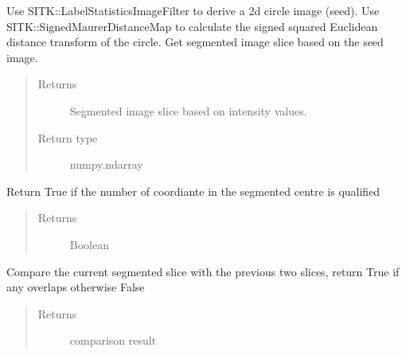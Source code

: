 \documentclass[letterpaper,10pt,english]{sphinxmanual}
\begin{document}
\begin{fulllineitems}
\begin{fulllineitems}
\label{\detokenize{AortaGeomReconDisplayModuleLib:AortaSegmenter.AortaSegmenter.__get_image_segment}}
\sphinxAtStartPar
Use SITK::LabelStatisticsImageFilter to derive a 2d circle image (seed).
Use SITK::SignedMaurerDistanceMap to calculate the signed squared Euclidean distance transform of the circle.
Get segmented image slice based on the seed image.
\begin{quote}\begin{description}
\item[{Returns}] \leavevmode
\sphinxAtStartPar
Segmented image slice based on intensity values.

\item[{Return type}] \leavevmode
\sphinxAtStartPar
numpy.ndarray

\end{description}\end{quote}

\end{fulllineitems}


\begin{fulllineitems}
\label{\detokenize{AortaGeomReconDisplayModuleLib:AortaSegmenter.AortaSegmenter.__is_new_centre_qualified}}
\sphinxAtStartPar
Return True if the number of coordiante in the segmented centre is qualified
\begin{quote}\begin{description}
\item[{Returns}] \leavevmode
\sphinxAtStartPar
Boolean

\end{description}\end{quote}

\end{fulllineitems}


\begin{fulllineitems}
\label{\detokenize{AortaGeomReconDisplayModuleLib:AortaSegmenter.AortaSegmenter.__is_overlapping}}
\sphinxAtStartPar
Compare the current segmented slice with the previous two slices,
return True if any overlaps otherwise False
\begin{quote}\begin{description}
\item[{Returns}] \leavevmode
\sphinxAtStartPar
comparison result


\end{description}
\end{quote}
\end{fulllineitems}
\end{fulllineitems}
\end{document}
